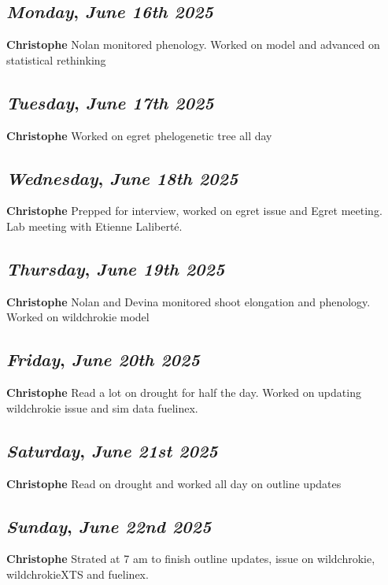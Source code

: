 \def\day{\textit{June 16th 2025}}
\def\weekday{\textit{Monday}}
\subsection*{\weekday, \day}
\textbf {Christophe}
Nolan monitored phenology. Worked on model and advanced on statistical rethinking

\def\day{\textit{June 17th 2025}}
\def\weekday{\textit{Tuesday}}
\subsection*{\weekday, \day}
\textbf {Christophe}
Worked on egret phelogenetic tree all day

\def\day{\textit{June 18th 2025}}
\def\weekday{\textit{Wednesday}}
\subsection*{\weekday, \day}
\textbf {Christophe}
Prepped for interview, worked on egret issue and Egret meeting. Lab meeting with Etienne Laliberté.

\def\day{\textit{June 19th 2025}}
\def\weekday{\textit{Thursday}}
\subsection*{\weekday, \day}
\textbf {Christophe}
Nolan and Devina monitored shoot elongation and phenology. Worked on wildchrokie model

\def\day{\textit{June 20th 2025}}
\def\weekday{\textit{Friday}}
\subsection*{\weekday, \day}
\textbf {Christophe}
Read a lot on drought for half the day. Worked on updating wildchrokie issue and sim data fuelinex.

\def\day{\textit{June 21st 2025}}
\def\weekday{\textit{Saturday}}
\subsection*{\weekday, \day}
\textbf {Christophe}
Read on drought and worked all day on outline updates 

\def\day{\textit{June 22nd 2025}}
\def\weekday{\textit{Sunday}}
\subsection*{\weekday, \day}
\textbf {Christophe}
Strated at 7 am to finish outline updates, issue on wildchrokie, wildchrokieXTS and fuelinex.

